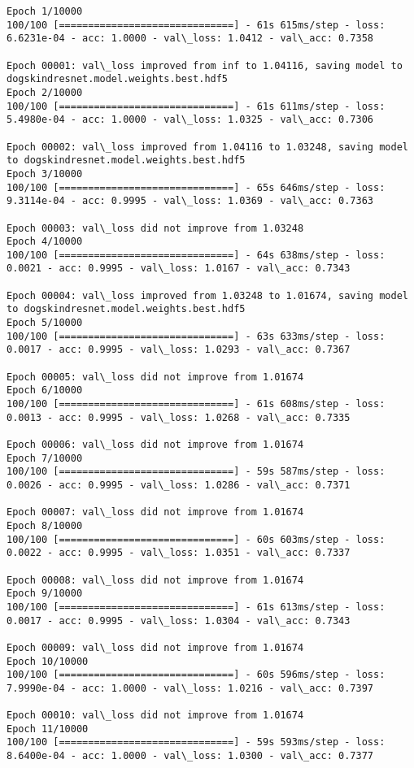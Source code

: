 \documentclass[11pt]{article}
\begin{document}
    \begin{Verbatim}[commandchars=\\\{\}]
Epoch 1/10000
100/100 [==============================] - 61s 615ms/step - loss: 6.6231e-04 - acc: 1.0000 - val\_loss: 1.0412 - val\_acc: 0.7358

Epoch 00001: val\_loss improved from inf to 1.04116, saving model to dogskindresnet.model.weights.best.hdf5
Epoch 2/10000
100/100 [==============================] - 61s 611ms/step - loss: 5.4980e-04 - acc: 1.0000 - val\_loss: 1.0325 - val\_acc: 0.7306

Epoch 00002: val\_loss improved from 1.04116 to 1.03248, saving model to dogskindresnet.model.weights.best.hdf5
Epoch 3/10000
100/100 [==============================] - 65s 646ms/step - loss: 9.3114e-04 - acc: 0.9995 - val\_loss: 1.0369 - val\_acc: 0.7363

Epoch 00003: val\_loss did not improve from 1.03248
Epoch 4/10000
100/100 [==============================] - 64s 638ms/step - loss: 0.0021 - acc: 0.9995 - val\_loss: 1.0167 - val\_acc: 0.7343

Epoch 00004: val\_loss improved from 1.03248 to 1.01674, saving model to dogskindresnet.model.weights.best.hdf5
Epoch 5/10000
100/100 [==============================] - 63s 633ms/step - loss: 0.0017 - acc: 0.9995 - val\_loss: 1.0293 - val\_acc: 0.7367

Epoch 00005: val\_loss did not improve from 1.01674
Epoch 6/10000
100/100 [==============================] - 61s 608ms/step - loss: 0.0013 - acc: 0.9995 - val\_loss: 1.0268 - val\_acc: 0.7335

Epoch 00006: val\_loss did not improve from 1.01674
Epoch 7/10000
100/100 [==============================] - 59s 587ms/step - loss: 0.0026 - acc: 0.9995 - val\_loss: 1.0286 - val\_acc: 0.7371

Epoch 00007: val\_loss did not improve from 1.01674
Epoch 8/10000
100/100 [==============================] - 60s 603ms/step - loss: 0.0022 - acc: 0.9995 - val\_loss: 1.0351 - val\_acc: 0.7337

Epoch 00008: val\_loss did not improve from 1.01674
Epoch 9/10000
100/100 [==============================] - 61s 613ms/step - loss: 0.0017 - acc: 0.9995 - val\_loss: 1.0304 - val\_acc: 0.7343

Epoch 00009: val\_loss did not improve from 1.01674
Epoch 10/10000
100/100 [==============================] - 60s 596ms/step - loss: 7.9990e-04 - acc: 1.0000 - val\_loss: 1.0216 - val\_acc: 0.7397

Epoch 00010: val\_loss did not improve from 1.01674
Epoch 11/10000
100/100 [==============================] - 59s 593ms/step - loss: 8.6400e-04 - acc: 1.0000 - val\_loss: 1.0300 - val\_acc: 0.7377


\end{Verbatim}
\end{document}

